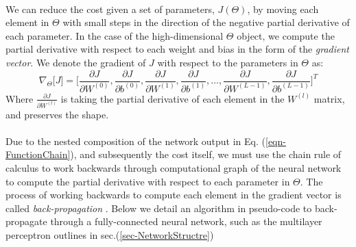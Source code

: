 \documentclass[12pt,letterpaper]{article}
\begin{document}
\paragraph*{}We can reduce the cost given a set of parameters, $J(\Theta)$, by moving each element in $\Theta$ with small steps in the direction of the negative partial derivative of each parameter. In the case of the high-dimensional $\Theta$ object, we compute the partial derivative with respect to each weight and bias in the form of the \textit{gradient vector}. We denote the gradient of $J$ with respect to the parameters in $\Theta$ as:
\begin{equation}
\label{eqn-CostGradient}
\nabla_{\Theta}\big[ J \big] = 
\Big[ 	\frac{\partial J}{\partial W^{(0)}}, \frac{\partial J}{\partial b^{(0)}}, 
		\frac{\partial J}{\partial W^{(1)}}, \frac{\partial J}{\partial b^{(1)}}, \hdots ,
		\frac{\partial J}{\partial W^{(L-1)}}, \frac{\partial J}{\partial b^{(L-1)}} \Big]^T
\end{equation}
Where $\frac{\partial J}{\partial W^{(l)}}$ is taking the partial derivative of each element in the $W^{(l)}$ matrix, and preserves the shape.

\paragraph*{}Due to the nested composition of the network output in Eq. (\ref{eqn-FunctionChain}), and subsequently the cost itself, we must use the chain rule of calculus to work backwards through computational graph of the neural network to compute the partial derivative with respect to each parameter in $\Theta$. The process of working backwards to compute each element in the gradient vector is called \textit{back-propagation} \cite{Geron}. Below we detail an algorithm in pseudo-code to back-propagate through a fully-connected neural network, such as the multilayer perceptron outlines in sec.(\ref{sec-NetworkStructre})
\end{document}
